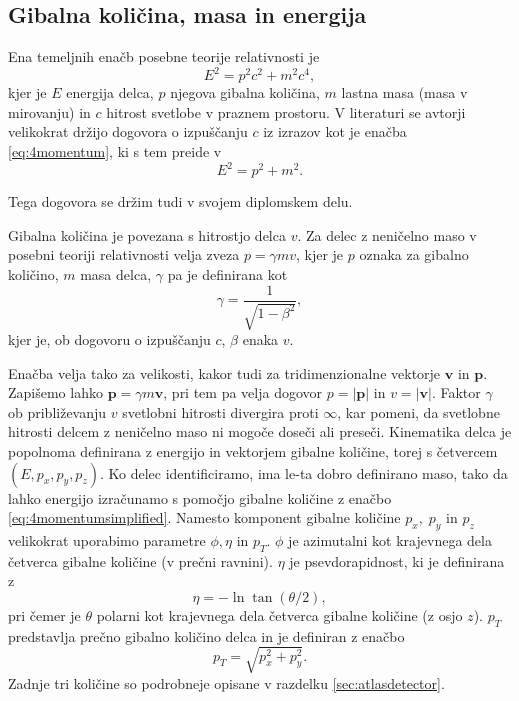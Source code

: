 \documentclass[11pt,a4paper,openany]{book}
\begin{document}
\subsection{Gibalna količina, masa in energija}
Ena temeljnih enačb posebne teorije relativnosti je
\begin{equation}
E^2 = p^2c^2 + m^2c^4,
\label{eq:4momentum}
\end{equation}
kjer je $E$ energija delca, $p$ njegova gibalna količina, $m$ lastna masa (masa v mirovanju) in $c$ hitrost svetlobe v praznem prostoru. V literaturi se avtorji velikokrat držijo dogovora o izpuščanju $c$ iz izrazov kot je enačba \ref{eq:4momentum}, ki s tem preide v 
\begin{equation}
E^2 = p^2 + m^2.
\label{eq:4momentumsimplified}
\end{equation}

\noindent Tega dogovora se držim tudi v svojem diplomskem delu.

Gibalna količina je povezana s hitrostjo delca $v$.  Za delec z neničelno maso v posebni teoriji relativnosti velja zveza $p = \gamma m v$, kjer je $p$ oznaka za gibalno količino, $m$ masa delca, $\gamma$ pa je definirana kot
\begin{equation}
\gamma = \frac{1}{\sqrt{1 - \beta^2}},
\label{eq:gamma}
\end{equation}
kjer je, ob dogovoru o izpuščanju $c$, $\beta$ enaka $v$.

Enačba velja tako za velikosti, kakor tudi za tridimenzionalne vektorje $\mathbf{v}$ in $\mathbf{p}$. Zapišemo lahko $\mathbf{p} = \gamma m \mathbf{v}$, pri tem pa velja dogovor $p = |\mathbf{p}|$ in $v = |\mathbf{v}|$. Faktor $\gamma$ ob približevanju $v$ svetlobni hitrosti divergira proti $\infty$, kar pomeni, da svetlobne hitrosti delcem z neničelno maso ni mogoče doseči ali preseči. Kinematika delca je popolnoma definirana z energijo in vektorjem gibalne količine, torej s četvercem $(E, p_x, p_y, p_z)$. Ko delec identificiramo, ima le-ta dobro definirano maso, tako da lahko energijo izračunamo s pomočjo gibalne količine z enačbo \ref{eq:4momentumsimplified}. Namesto komponent gibalne količine $p_x,\;p_y$ in $p_z$ velikokrat uporabimo parametre $\phi, \eta$ in $p_T$. $\phi$ je azimutalni kot krajevnega dela četverca gibalne količine (v prečni ravnini). $\eta$ je psevdorapidnost, ki je definirana z
\begin{equation}
\eta = -\ln \tan(\theta/2),
\label{eq:pseudorapidity}
\end{equation}
pri čemer je $\theta$ polarni kot krajevnega dela četverca gibalne količine (z osjo $z$). $p_T$ predstavlja prečno gibalno količino delca in je definiran z enačbo
\begin{equation}
p_T = \sqrt{p_x^2 + p_y^2}.
\label{eq:transversemomentum}
\end{equation}
Zadnje tri količine so podrobneje opisane v razdelku \ref{sec:atlasdetector}.
\end{document}
